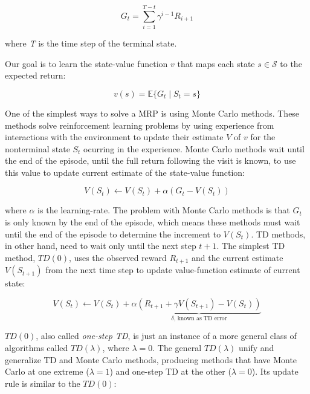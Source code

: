 \documentclass{article}
\begin{document}
    \begin{equation}
        G_{t} = \sum_{i=1}^{T-t} \gamma^{i-1} R_{i+1}\label{eqn:1}
    \end{equation}

    where \emph{T} is the time step of the terminal state.

    Our goal is to learn the state-value function $v$ that maps each state $s \in \mathcal{S}$ to the expected return:

    \begin{equation}
        v(s) = \mathbb{E}\{G_{t} \mid S_{t} = s\}\label{eqn:2}
    \end{equation}

    One of the simplest ways to solve a MRP is using Monte Carlo methods.
    These methods solve reinforcement learning problems by using experience from interactions with the environment to update their estimate $V$ of $v$ for the nonterminal state $S_{t}$ ocurring in the experience.
    Monte Carlo methods wait until the end of the episode, until the full return following the visit is known, to use this value to update current estimate of the state-value function:

    \begin{equation}
        V(S_{t}) \leftarrow V(S_{t}) + \alpha(G_{t} - V(S_{t}))\label{eqn:3}
    \end{equation}


    where $\alpha$ is the learning-rate.
    The problem with Monte Carlo methods is that $G_{t}$ is only known by the end of the episode, which means these methods must wait until the end of the episode to determine the increment to $V(S_{t})$.
    TD methods, in other hand, need to wait only until the next step $t + 1$.
    The simplest TD method, $TD(0)$, uses the observed reward $R_{t+1}$ and the current estimate $V(S_{t+1})$ from the next time step to update value-function estimate of current state:

    \begin{equation}
        V(S_{t}) \leftarrow V(S_{t}) + \alpha \underbrace{(R_{t+1} + \gamma V(S_{t+1}) - V(S_{t}))}_{\delta \text{, known as TD error}} \label{eqn:4}
    \end{equation}

    $TD(0)$, also called \emph{one-step TD}, is just an instance of a more general class of algorithms called $TD(\lambda)$, where $\lambda = 0$.
    The general $TD(\lambda)$ unify and generalize TD and Monte Carlo methods, producing methods that have Monte Carlo at one extreme ($\lambda = 1$) and one-step TD at the other ($\lambda = 0$).
    Its update rule is similar to the $TD(0)$:
\end{document}
